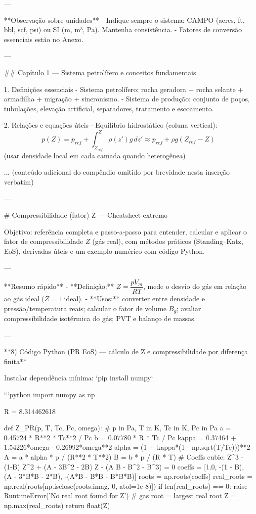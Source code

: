 \documentclass[11pt,a4paper]{article}
\begin{document}
---

**Observação sobre unidades**
- Indique sempre o sistema: CAMPO (acres, ft, bbl, scf, psi) ou SI (m, m³, Pa). Mantenha consistência.
- Fatores de conversão essenciais estão no Anexo.

---

## Capítulo 1 — Sistema petrolífero e conceitos fundamentais

1. Definições essenciais
- Sistema petrolífero: rocha geradora + rocha selante + armadilha + migração + sincronismo. 
- Sistema de produção: conjunto de poços, tubulações, elevação artificial, separadores, tratamento e escoamento.

2. Relações e equações úteis
- Equilíbrio hidrostático (coluna vertical):
$$p(Z)=p_{ref}+\int_{Z_{ref}}^{Z}\rho(z') g\,dz'\approx p_{ref}+\rho g (Z_{ref}-Z)$$
(usar densidade local em cada camada quando heterogênea)

... (conteúdo adicional do compêndio omitido por brevidade nesta inserção verbatim)

---

# Compressibilidade (fator) Z — Cheatsheet extremo

Objetivo: referência completa e passo‑a‑passo para entender, calcular e aplicar o fator de compressibilidade $Z$ (gás real), com métodos práticos (Standing–Katz, EoS), derivadas úteis e um exemplo numérico com código Python.

---

**Resumo rápido**
- **Definição:** $Z = \dfrac{p V_m}{R T}$, mede o desvio do gás em relação ao gás ideal ($Z=1$ ideal).
- **Usos:** converter entre densidade e pressão/temperatura reais; calcular o fator de volume $B_g$; avaliar compressibilidade isotérmica do gás; PVT e balanço de massas.

---

**8) Código Python (PR EoS) — cálculo de Z e compressibilidade por diferença finita**

Instalar dependência mínima: `pip install numpy`

```python
import numpy as np

R = 8.314462618

def Z_PR(p, T, Tc, Pc, omega):
	# p in Pa, T in K, Tc in K, Pc in Pa
	a = 0.45724 * R**2 * Tc**2 / Pc
	b = 0.07780 * R * Tc / Pc
	kappa = 0.37464 + 1.54226*omega - 0.26992*omega**2
	alpha = (1 + kappa*(1 - np.sqrt(T/Tc)))**2
	A = a * alpha * p / (R**2 * T**2)
	B = b * p / (R * T)
	# Coeffs cubic: Z^3 - (1-B) Z^2 + (A - 3B^2 - 2B) Z - (A B - B^2 - B^3) = 0
	coeffs = [1.0, -(1 - B), (A - 3*B*B - 2*B), -(A*B - B*B - B*B*B)]
	roots = np.roots(coeffs)
	real_roots = np.real(roots[np.isclose(roots.imag, 0, atol=1e-8)])
	if len(real_roots) == 0:
		raise RuntimeError('No real root found for Z')
	# gas root = largest real root
	Z = np.max(real_roots)
	return float(Z)
\end{document}
